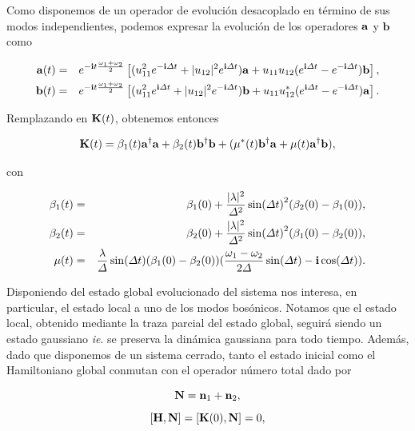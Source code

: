 \documentclass{report} %
\numberwithin{equation}{section}
\begin{document}
Como disponemos de un operador de evolución desacoplado en término de sus modos independientes, podemos expresar la evolución de los operadores ${\bf a}$ y ${\mathbf b}$ como

\begin{eqnarray*}
  {\bf a}(t)&=& e^{-{\bf i}t\frac{\omega_1+\omega_2}{2}}\left[(u_{11}^2e^{-{\bf i}\Delta t}+|u_{12}|^2e^{{\bf i}\Delta t}){\bf a}+
                u_{11}u_{12}(e^{{\bf i}\Delta t}-e^{-{\bf i}\Delta t}){\mathbf b}\right],\\
  {\mathbf b}(t)&=& e^{-{\bf i}t\frac{\omega_1+\omega_2}{2}}\left[(u_{11}^2e^{{\bf i}\Delta t}+|u_{12}|^2e^{-{\bf i}\Delta t}){\mathbf b}+
                u_{11}u^*_{12}(e^{{\bf i}\Delta t}-e^{-{\bf i}\Delta t}){\bf a}\right].\\
\end{eqnarray*}

Remplazando en ${\bf K}(t)$, obtenemos entonces

\begin{equation}
{\bf K}(t)=\beta_1(t) {\bf a}^\dag{\bf a} + \beta_2(t) {\mathbf b}^\dag{\mathbf b} +  (\mu^*(t){\mathbf b}^\dag{\bf a}+\mu(t){\bf a}^\dag{\mathbf b}),
\end{equation}

con

\begin{eqnarray}
  \beta_1(t)&=&\beta_1(0) + \frac{|\lambda|^2}{\Delta^2}
                \sin(\Delta t)^2 (\beta_2(0) -\beta_1(0) ),  \\
  \beta_2(t)&=& \beta_2(0)
                + \frac{|\lambda|^2}{\Delta^2}
                \sin(\Delta t)^2 (\beta_1(0) -\beta_2(0) ), \\
  \mu(t)  &=& \frac{\lambda}{\Delta}\sin(\Delta t)
              (\beta_1(0)-\beta_2(0))( \frac{\omega_1-\omega_2}{2\Delta }\sin(\Delta t)  -{\bf i}\cos(\Delta t)).
\end{eqnarray}

Disponiendo del estado global evolucionado del sistema nos interesa, en particular, el estado local a uno de los modos bosónicos. Notamos que el estado local, obtenido mediante la traza parcial del estado global, seguirá siendo un estado gaussiano \textit{ie}. se preserva la dinámica gaussiana para todo tiempo. Además, dado que disponemos de un sistema cerrado,  tanto el estado inicial como el Hamiltoniano global conmutan con el operador número total dado por 

$$
{\bf N}={\bf n}_1+{\bf n}_2,$$
$$
[{\bf H},{\bf N}]=[{\bf K}(0),{\bf N}]=0,
$$
\end{document}
